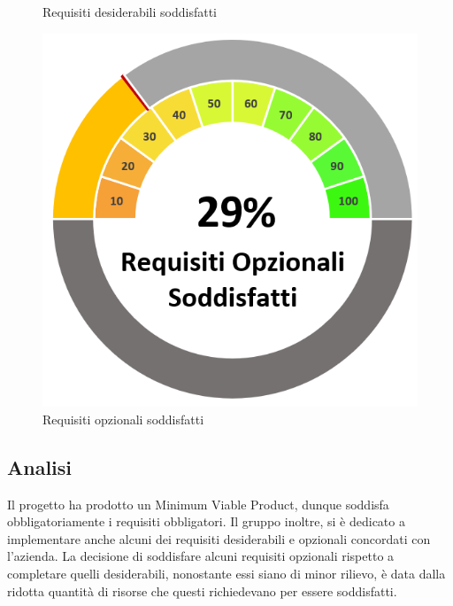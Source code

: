 \begin{figure}[H]
\begin{minipage}[b]{0.32\textwidth}
        \caption{Requisiti desiderabili soddisfatti}
        \label{reqdessodd}
    \end{minipage}
    \hfill
    \begin{minipage}[b]{0.32\textwidth}
        \centering
        \includegraphics[width=\textwidth]{ReqOpzSodd.png}
        \caption{Requisiti opzionali soddisfatti}
        \label{reqopzsodd}
    \end{minipage}
\end{figure}
\subsection{Analisi}
Il progetto ha prodotto un Minimum Viable Product, dunque soddisfa obbligatoriamente i requisiti obbligatori. Il gruppo inoltre, si è dedicato a implementare anche alcuni dei requisiti desiderabili e opzionali concordati con l'azienda. La decisione di soddisfare alcuni requisiti opzionali rispetto a completare quelli desiderabili, nonostante essi siano di minor rilievo, è data dalla ridotta quantità di risorse che questi richiedevano per essere soddisfatti.

